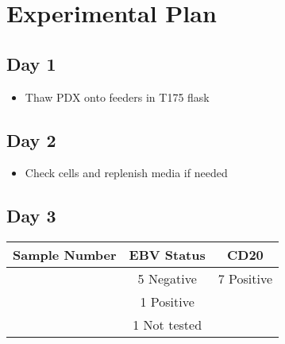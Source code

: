 \documentclass[
]{article}
\providecommand{\tightlist}{%
  \setlength{\itemsep}{0pt}\setlength{\parskip}{0pt}}
\begin{document}
\hypertarget{experimental-plan}{%
\section{Experimental Plan}\label{experimental-plan}}

\hypertarget{day-1}{%
\subsection{Day 1}\label{day-1}}

\begin{itemize}
\tightlist
\item
  Thaw PDX onto feeders in T175 flask
\end{itemize}

\hypertarget{day-2}{%
\subsection{Day 2}\label{day-2}}

\begin{itemize}
\tightlist
\item
  Check cells and replenish media if needed
\end{itemize}

\hypertarget{day-3}{%
\subsection{Day 3}\label{day-3}}

\begin{longtable}[]{@{}ccc@{}}
\toprule\noalign{}
Sample Number & EBV Status & CD20 \\
\midrule\noalign{}
\endhead
\bottomrule\noalign{}
\endlastfoot
7 & 5 Negative & 7 Positive \\
& 1 Positive & \\
& 1 Not tested & \\
\end{longtable}
\end{document}
